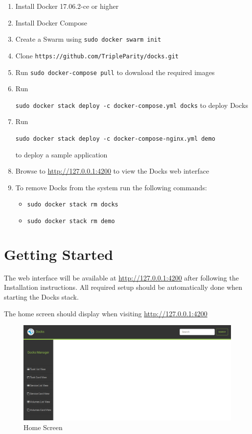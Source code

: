 \documentclass[]{article}
\providecommand{\tightlist}{%
	\setlength{\itemsep}{0pt}\setlength{\parskip}{0pt}}
\let\oldtexttt\texttt
\renewcommand{\texttt}[1]{
	\colorbox{Light}{\oldtexttt{#1}}
}
\begin{document}
\begin{enumerate}
	\def\labelenumi{\arabic{enumi}.}
	\tightlist
	\item
	  Install Docker 17.06.2-ce or higher
	\item
	  Install Docker Compose
	\item
	  Create a Swarm using \texttt{sudo\ docker\ swarm\ init}
	\item
	  Clone \texttt{https://github.com/TripleParity/docks.git}
	\item
	  Run \texttt{sudo\ docker-compose\ pull} to download the required
	  images
	\item
	  Run
	  \texttt{sudo\ docker\ stack\ deploy\ -c\ docker-compose.yml\ docks} to
	  deploy Docks
	\item
	  Run
	  \texttt{sudo\ docker\ stack\ deploy\ -c\ docker-compose-nginx.yml\ demo}
	  to deploy a sample application
	\item
	  Browse to \url{http://127.0.0.1:4200} to view the Docks web interface
	\item
	  To remove Docks from the system run the following commands:
	
	  \begin{itemize}
	  \tightlist
	  \item
		\texttt{sudo\ docker\ stack\ rm\ docks}
	  \item
		\texttt{sudo\ docker\ stack\ rm\ demo}
	  \end{itemize}
	\end{enumerate}


\section{Getting Started}
The web interface will be available at \url{http://127.0.0.1:4200} after following the Installation instructions.
All required setup should be automatically done when starting the Docks stack.

The home screen should display when visiting \url{http://127.0.0.1:4200}

\begin{figure}[H]
	\centering
	\includegraphics[scale=0.4]{home.png}
	\caption{Home Screen}
\end{figure}
\end{document}
